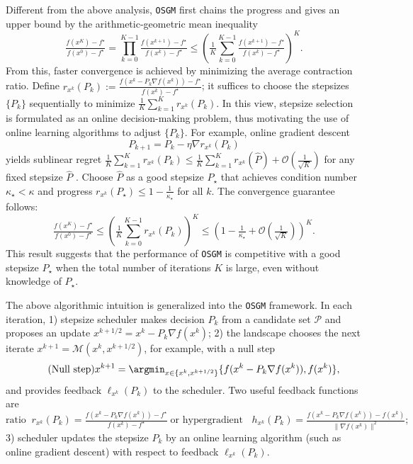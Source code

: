 \documentclass{article}
\theoremstyle{definition}
\newcommand{\assign}{:=}
\newcommand{\os}{\texttt{OSGM}}
\begin{document}
Different from the above analysis, {\os} first chains the progress and gives an upper bound by the arithmetic-geometric mean inequality
\[
\tfrac{f(x^{K}) - f^\star}{f(x^0) - f^\star}=\textstyle \prod_{k=0}^{K-1} \tfrac{f(x^{k+1})-f^\star}{f(x^k) - f^\star} \leq (\tfrac{1}{K} \textstyle \sum_{k=0}^{K-1} \tfrac{f(x^{k+1})-f^\star}{f(x^k) - f^\star} )^K .
\]
From this, faster convergence is achieved by minimizing the average contraction ratio. Define $r_{x^k}(P_k) \assign \tfrac{f(x^{k} - P_k \nabla f(x^k))-f^\star}{f(x^k) - f^\star}$; it suffices to choose the stepsizes $\{P_k\}$ sequentially to minimize $\tfrac{1}{K} \textstyle \sum_{k=1}^{K} r_{x^k}(P_k)$. In this view, stepsize selection is formulated as an online decision-making problem, thus motivating the use of online learning algorithms to adjust $\{P_k\}$. For example, online gradient descent 
\[
P_{k+1} = P_k - \eta \nabla r_{x^k} (P_k)
\]
yields sublinear regret $\tfrac{1}{K} \textstyle \sum_{k=1}^{K} r_{x^k}(P_k)\leq \tfrac{1}{K} \textstyle \sum_{k=1}^{K} r_{x^k}(\hat P) + \mathcal{O}(\tfrac{1}{\sqrt{K}})$ for any fixed stepsize $\hat P$ \cite{orabona2019modern}. Choose $\hat P$ as a good stepsize $P_{\star}$ that achieves condition number $\kappa_\star < \kappa$ and progress $r_{x^k} (P_{\star}) \leq 1 - \tfrac{1}{\kappa_\star}$ for all $k$. The convergence guarantee follows:
\[
\tfrac{f(x^{K}) - f^\star}{f(x^0) - f^\star}\leq 
(\tfrac{1}{K} \textstyle \sum_{k=0}^{K-1} r_{x^k}(P_k) )^K \leq
(1 - \tfrac{1}{\kappa_\star} + \mathcal{O}(\tfrac{1}{\sqrt{K}}) )^K.
\]
This result suggests that the performance of {\os} is competitive with a good stepsize $P_\star$ when the total number of iterations $K$ is large, even without knowledge of $P_\star$.

The above algorithmic intuition is generalized into the {\os} framework. In each iteration, 
1) stepsize scheduler makes decision $P_k$ from a candidate set $\mathcal{P}$ and proposes an update $x^{k+1/2} = x^k - P_k \nabla f(x^k)$; 
2) the landscape chooses the next iterate $x^{k+1} = \mathcal{M} (x^k, x^{k+1/2})$, for example, with a null step
\begin{equation}\tag{Null step}
  x^{k+1} = \argmin_{x \in \{x^k, x^{k+1/2}\}} \{f(x^k - P_k \nabla f(x^k)), f(x^k)\},
\end{equation}
and provides feedback $\ell_{x^k}(P_k)$ to the scheduler. Two useful feedback functions are
\begin{equation}\label{eq:dtm-feedback}
  \text{ratio} \;\;
  r_{x^k}(P_k) = \tfrac{f(x^k - P_k \nabla f(x^k))-f^\star}{f(x^k) - f^\star} \; 
  \text{or hypergradient } \;\;
  h_{x^k}(P_k) = \tfrac{f(x^k - P_k \nabla f(x^k))-f(x^k)}{\|\nabla f(x^k)\|^2};
\end{equation}
3) scheduler updates the stepsize $P_k$ by an online learning algorithm (such as online gradient descent) with respect to feedback $\ell_{x^k}(P_k)$.
\end{document}
